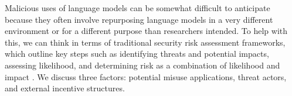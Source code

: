 Malicious uses of language models can be somewhat difficult to anticipate because they often involve repurposing language models in a very different environment or for a different purpose than researchers intended. To help with this, we can think in terms of traditional security risk assessment frameworks, which outline key steps such as identifying threats and potential impacts, assessing likelihood, and determining risk as a combination of likelihood and impact \cite{ross2012risk}.  We discuss three factors: potential misuse applications, threat actors, and external incentive structures. 